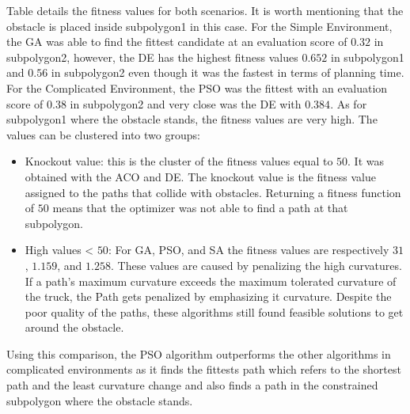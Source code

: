 Table  details the fitness values for both scenarios. It is worth mentioning
that the obstacle is placed inside subpolygon1 in this case.
For the Simple Environment, the GA was able to find the fittest candidate at an evaluation score of 
\(0.32\) in subpolygon2, however, the DE has the highest fitness values \(0.652\) in subpolygon1 and \(0.56\) in subpolygon2 
even though it was the fastest in terms of planning time.
For the Complicated Environment, the PSO was the fittest with an evaluation score of \(0.38\) in subpolygon2 and very 
close was the DE with \(0.384\). As for subpolygon1 where the obstacle stands, the fitness values are very high.
The values can be clustered into two groups:
\begin{itemize}
    \item Knockout value: this is the cluster of the fitness values equal to \(50\). It was obtained
    with the ACO and DE. The knockout value is the fitness value assigned to the paths that collide with obstacles.
    Returning a fitness function of \(50\) means that the optimizer was not able to find a path at that subpolygon.
    \item High values < \(50\): For GA, PSO, and SA the fitness values are respectively \(31\), \(1.159\), and \(1.258\).
    These values are caused by penalizing the high curvatures.
    If a path's maximum curvature exceeds the maximum tolerated curvature of the truck, the Path gets penalized by 
    emphasizing it curvature. Despite the poor quality of the paths, these algorithms still found feasible solutions 
    to get around the obstacle. 
\end{itemize}

Using this comparison, the PSO algorithm outperforms the other algorithms in complicated environments as it 
finds the fittests path which refers to the shortest path and the least curvature change and also finds a path in 
the constrained subpolygon where the obstacle stands.


